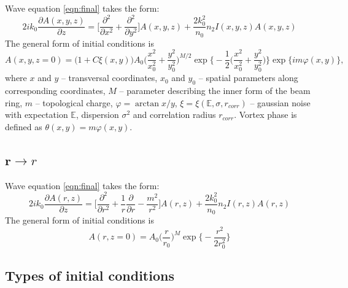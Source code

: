 \documentclass[a4paper, 12pt]{article}
\begin{document}
Wave equation \eqref{eqn:final} takes the form:
\begin{equation}
2 i k_0 \frac{\partial A (x, y, z)}{\partial z} = \biggl[ \frac{\partial^2}{\partial x^2} + \frac{\partial^2}{\partial y^2} \biggr] A (x, y, z) + \frac{2 k_0^2}{n_0} n_2 I(x, y, z) A(x, y, z)
\end{equation}
The general form of initial conditions is
\begin{equation}
A(x,y, z = 0) = \biggl(1 + C \xi(x,y)\biggr)A_0 \biggl(\frac{x^2}{x_0^2}+\frac{y^2}{y_0^2}\biggr)^{M/2}\exp\biggl\{-\frac1{2}\biggl(\frac{x^2}{x_0^2}+\frac{y^2}{y_0^2}\biggr)\biggr\}\exp\biggl\{i m \varphi(x,y)\biggr\},
\end{equation}
where $x$ and $y$ -- transversal coordinates, $x_0$ and $y_0$ -- spatial parameters along corresponding coordinates, $M$ -- parameter describing the inner form of the beam ring, $m$ -- topological charge, $\varphi=\arctan{x/y}$, $\xi=\xi(\mathbb{E}, \sigma, r_{corr})$ -- gaussian noise with expectation $\mathbb{E}$, dispersion $\sigma^2$ and correlation radius $r_{corr}$. Vortex phase is defined as $\theta(x,y) = m \varphi(x,y)$.


\subsection{$\mathbf{r}\longrightarrow r$}

Wave equation \eqref{eqn:final} takes the form:
\begin{equation}
2 i k_0 \frac{\partial A (r, z)}{\partial z} = \biggl[ \frac{\partial^2}{\partial r^2} + \frac1{r}\frac{\partial}{\partial r} - \frac{m^2}{r^2} \biggr] A (r, z) + \frac{2 k_0^2}{n_0} n_2 I(r, z) A(r, z)
\end{equation}
The general form of initial conditions is
\begin{equation}
A(r,z=0) = A_0 \biggl( \frac{r}{r_0} \biggr)^M \exp \biggl\{ -\frac{r^2}{2r_0^2} \biggr\}
\end{equation}

\subsection{Types of initial conditions}
\end{document}
